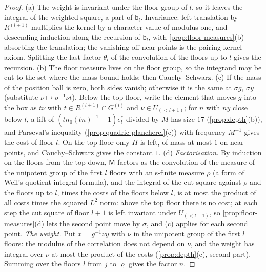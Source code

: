 \begin{proof}
(a) The weight is invariant under the floor group of $l$, so it leaves the integral of the weighted square, a part of $\mathsf b_l$. Invariance: left translation by $R^{(l+1)}$ multiplies the kernel by a character value of modulus one, and
descending induction along the recursion of $\mathsf b_l$, with \cref{prop:floor-measures}(b) absorbing the translation; the vanishing off near points is the pairing kernel axiom. Splitting the last factor $\theta_l$ of the convolution of
the floors up to $l$ gives the recursion. (b) The floor measure lives on the floor group, so the integrand may be cut to the set where the mass bound holds; then Cauchy--Schwarz. (c) If the mass of the position ball is zero,
both sides vanish; otherwise it is the same at $\sigma g$, $\sigma y$ (substitute $\nu\mapsto\sigma^{-1}\nu t$). Below the top floor, write the element that moves $g$ into the box as $t\nu$ with $t\in R^{(l+1)}\cap G^{(l)}$ and $\nu\in U_{(<l+1)}$; for $n$
with $ny$ close below $l$, a lift of $(tn_0(tn)^{-1}-1)e^*_l$ divided by $M$ has size $17$ (\cref{prop:depth}(b)), and Parseval's inequality (\cref{prop:quadric-plancherel}(c)) with frequency $M^{-1}$ gives the cost of floor $l$. On the top floor
only $H$ is left, of mass at most $1$ on near points, and Cauchy--Schwarz gives the constant $1$. (d) \emph{Factorisation.} By induction on the floors from the top down, $\mathsf M$ factors as the convolution of the measure of the unipotent group
of the first $l$ floors with an s-finite measure $\rho$ (a form of Weil's quotient integral formula), and the integral of the cut square against $\rho$ and the floors up to $l$, times the costs of the floors below $l$, is at most the product
of all costs times the squared $L^2$ norm: above the top floor there is no cost; at each step the cut square of floor $l+1$ is left invariant under $U_{(<l+1)}$, so \cref{prop:floor-measures}(d) lets the second point move by $\sigma$, and (c) applies
for each second point. \emph{The weight.} Put $x=g^{-1}\nu y$ with $\nu$ in the unipotent group of the first $l$ floors: the modulus of the correlation does not depend on $\nu$, and the weight has integral over $\nu$ at most the product of
the costs (\cref{prop:depth}(c), second part). Summing over the floors $l$ from $j$ to $\varrho$ gives the factor $n$.
\end{proof}

